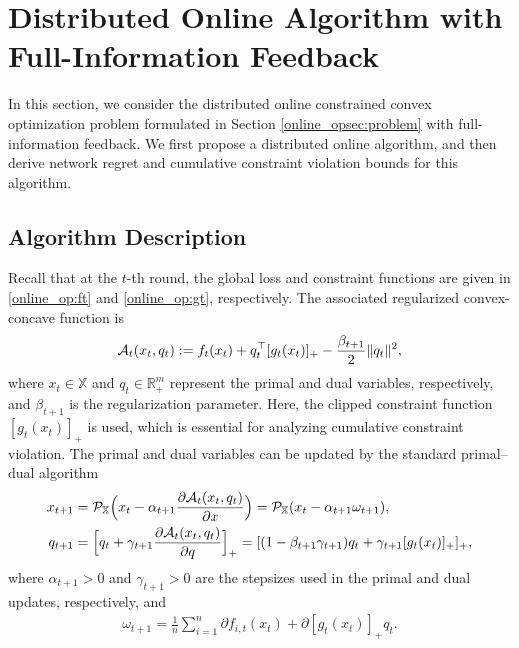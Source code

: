 \documentclass[12pt,draftcls,onecolumn]{IEEEtran}%
\begin{document}
\section{Distributed Online Algorithm with Full-Information Feedback}\label{online_opsec:algorithm}
In this section, we  consider  the distributed online constrained convex optimization problem formulated in Section \ref{online_opsec:problem} with full-information feedback. We first propose a distributed online algorithm, and then derive network regret and cumulative constraint violation bounds for this algorithm.


\subsection{Algorithm Description}

Recall that at the $t$-th round, the global loss and constraint functions are given in \eqref{online_op:ft} and \eqref{online_op:gt}, respectively. The associated regularized convex-concave function is
\begin{align*}
	{\mathcal{A}}_{t}(x_t,q_t):=f_{t}(x_t)
	+q_t^\top [g_t(x_t)]_+-\frac{\beta_{t+1}}{2}\|q_t\|^2,
\end{align*}
where $x_t\in\mathbb{X}$ and $q_t\in\mathbb{R}^m_+$ represent the primal and dual variables, respectively, and $\beta_{t+1}$ is the regularization parameter. Here, the clipped constraint function $[g_t(x_t)]_+$ is used, which is essential for analyzing cumulative constraint violation. The primal and dual variables can be updated by the standard primal--dual algorithm
\begin{align}
	x_{t+1}&={\mathcal{P}}_\mathbb{X}\Big(x_t-\alpha_{t+1}\frac{\partial {\mathcal{A}}_{t}(x_t,q_t)}{\partial x}\Big)
	={\mathcal{P}}_\mathbb{X}(x_t-\alpha_{t+1}\omega_{t+1}),\label{online_op:al_c_x}\\
	q_{t+1}&=\Big[q_t+\gamma_{t+1}\frac{\partial {\mathcal{A}}_{t}(x_t,q_t)}{\partial q}\Big]_+
	=[(1-\beta_{t+1}\gamma_{t+1})q_t+\gamma_{t+1}[g_t(x_t)]_+]_+,\label{online_op:al_c_q}
\end{align}
where $\alpha_{t+1}>0$ and $\gamma_{t+1}>0$ are the stepsizes used in the primal and dual updates, respectively, and
\begin{align*}
	\omega_{t+1}=\frac{1}{n}\sum_{i=1}^{n}\partial f_{i,t}(x_{t})+\partial [g_{t}(x_{t})]_+ q_{t}.
\end{align*}
\end{document}
